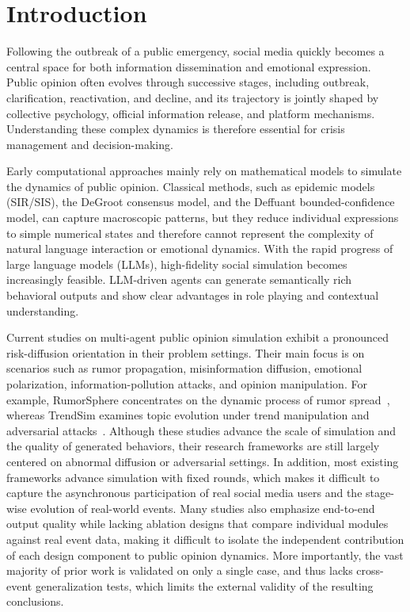 \section{Introduction}

Following the outbreak of a public emergency, social media quickly becomes a central space for both information dissemination and emotional expression. Public opinion often evolves through successive stages, including outbreak, clarification, reactivation, and decline, and its trajectory is jointly shaped by collective psychology, official information release, and platform mechanisms. Understanding these complex dynamics is therefore essential for crisis management and decision-making.

Early computational approaches mainly rely on mathematical models to simulate the dynamics of public opinion. Classical methods, such as epidemic models (SIR/SIS), the DeGroot consensus model, and the Deffuant bounded-confidence model, can capture macroscopic patterns, but they reduce individual expressions to simple numerical states and therefore cannot represent the complexity of natural language interaction or emotional dynamics. With the rapid progress of large language models (LLMs), high-fidelity social simulation becomes increasingly feasible. LLM-driven agents can generate semantically rich behavioral outputs and show clear advantages in role playing and contextual understanding.

Current studies on multi-agent public opinion simulation exhibit a pronounced risk-diffusion orientation in their problem settings. Their main focus is on scenarios such as rumor propagation, misinformation diffusion, emotional polarization, information-pollution attacks, and opinion manipulation. For example, RumorSphere concentrates on the dynamic process of rumor spread~\citep{liu2025rumorsphere}, whereas TrendSim examines topic evolution under trend manipulation and adversarial attacks~\citep{zhang2025trendsim}. Although these studies advance the scale of simulation and the quality of generated behaviors, their research frameworks are still largely centered on abnormal diffusion or adversarial settings. In addition, most existing frameworks advance simulation with fixed rounds, which makes it difficult to capture the asynchronous participation of real social media users and the stage-wise evolution of real-world events. Many studies also emphasize end-to-end output quality while lacking ablation designs that compare individual modules against real event data, making it difficult to isolate the independent contribution of each design component to public opinion dynamics. More importantly, the vast majority of prior work is validated on only a single case, and thus lacks cross-event generalization tests, which limits the external validity of the resulting conclusions.

